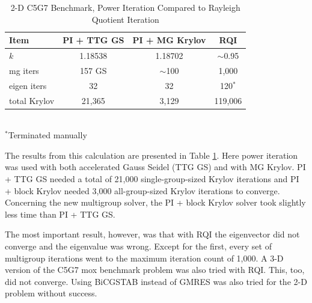 \begin{table}[!h]
\caption{2-D C5G7 Benchmark, Power Iteration Compared to Rayleigh Quotient Iteration}
\begin{center}
\begin{tabular}{| l | c | c | c |}
\hline
Item & PI + TTG GS & PI +  MG Krylov & RQI \\[0.5ex]
\hline
$k$ & 1.18538 & 1.18702 & $\sim$0.95 \\
mg iters & 157 GS & $\sim$100 & 1,000 \\
eigen iters & 32 & 32 & 120$^{*}$ \\
total Krylov & 21,365 & 3,129 & 119,006 \\
\hline 
\end{tabular} \\
$^{*}$Terminated manually
\end{center}
\label{table:2DMoxRQI}
\end{table}
%
The results from this calculation are presented in Table \ref{table:2DMoxRQI}. Here power iteration was used with both accelerated Gauss Seidel (TTG GS) and with MG Krylov. PI + TTG GS needed a total of 21,000 single-group-sized Krylov iterations and PI + block Krylov needed 3,000 all-group-sized Krylov iterations to converge. Concerning the new multigroup solver, the PI + block Krylov solver took slightly less time than PI + TTG GS. 

The most important result, however, was that with RQI the eigenvector did not converge and the eigenvalue was wrong. Except for the first, every set of multigroup iterations went to the maximum iteration count of 1,000. A 3-D version of the C5G7 mox benchmark problem \cite{OECD-NEA2005} was also tried with RQI. This, too, did not converge. Using BiCGSTAB instead of GMRES was also tried for the 2-D problem without success. 

